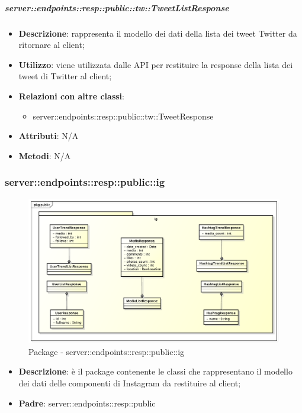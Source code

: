     \subparagraph{server::endpoints::resp::public::tw::TweetListResponse} %
    \label{subp:bdsm_app_server_endpoints_resp_public_tw_tweetlistresponse}
    \begin{itemize}
      \item \textbf{Descrizione}: rappresenta il modello dei dati della lista dei tweet Twitter da ritornare al client;
      \item \textbf{Utilizzo}: viene utilizzata dalle API per restituire la response della lista dei tweet di Twitter al client;
      \item \textbf{Relazioni con altre classi}:
        \begin{itemize}
          \item server::endpoints::resp::public::tw::TweetResponse
        \end{itemize}
    \item \textbf{Attributi}: N/A
    \item \textbf{Metodi}: N/A
    \end{itemize}

\subsubsection{server::endpoints::resp::public::ig} %
\label{ssub:bdsm_app_server_endpoints_resp_public_ig}
\begin{figure}[!htbp]
  \centering
  \centerline{\includegraphics[scale=0.5]{./images/server/resp_ig.pdf}}
  \caption{Package - server::endpoints::resp::public::ig}
\end{figure}

\begin{itemize}
  \item \textbf{Descrizione}: è il package contenente le classi che rappresentano il modello dei dati delle componenti di Instagram da restituire al client;
  \item \textbf{Padre}: server::endpoints::resp::public
\end{itemize}

